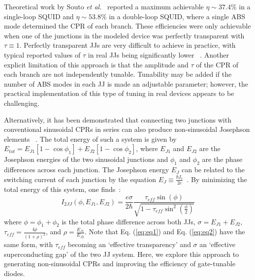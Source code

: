 \documentclass[%
 reprint,
 amsmath,amssymb,
 aps,
]{revtex4-2}
\begin{document}
Theoretical work by Souto {\it et al.}~\cite{Souto2022} reported a maximum achievable $\eta \sim 37.4\%$ in a single-loop SQUID and $\eta \sim 53.8\%$ in a double-loop SQUID, where a single ABS mode determined the CPR of each branch. These efficiencies were only achievable when one of the junctions in the modeled device was perfectly transparent with $\tau\equiv1$. Perfectly transparent JJs are very difficult to achieve in practice, with typical reported values of $\tau$ in real JJs being significantly lower ~\cite{Schonenberger2023,Nichele2020,Leblanc2024}. Another explicit limitation of this approach is that the amplitude and $\tau$ of the CPR of each branch are not independently tunable. Tunability may be added if the number of ABS modes in each JJ is made an adjustable parameter; however, the practical implementation of this type of tuning in real devices appears to be challenging.

Alternatively, it has been demonstrated that connecting two junctions with conventional sinusoidal CPRs in series can also produce non-sinusoidal Josephson elements ~\cite{Marcus2024,Bozkurt2023,Barash2018}. The total energy of such a system is given by $E_{tot}=E_{J1}[1-\cos\phi_1]+E_{J2}[1-\cos\phi_2]$, where $E_{J1}$ and $E_{J2}$ are the Josephson energies of the two sinusoidal junctions and $\phi_1$ and $\phi_2$ are the phase differences across each junction. The Josephson energy $E_J$ can be related to the switching current of each junction by the equation $E_J\equiv\frac{\hbar I_c}{2e}$~\cite{tinkham1996}. By minimizing the total energy of this system, one finds~\cite{JJReview2004,Bozkurt2023}:
\begin{equation}
    \label{eq:eq2}
    I_{2JJ}(\phi,E_{J1},E_{J2}) = \frac{e \sigma}{2\hbar} \frac{\tau_{eff} \sin(\phi)}{\sqrt{1-\tau_{eff} \sin^2(\frac{\phi}{2})}}
\end{equation}
where $\phi=\phi_1+\phi_2$ is the total phase difference across both JJs, $\sigma=E_{J1}+E_{J2}$, $\tau_{eff}=\frac{4\rho}{(1+\rho)^2}$, and $\rho=\frac{E_{J1}}{E_{J2}}$. Note that Eq. (\ref{eq:eq1}) and Eq. (\ref{eq:eq2}) have the same form, with $\tau_{eff}$ becoming an `effective transparency' and $\sigma$ an `effective superconducting gap' of the two JJ system. Here, we explore this approach to generating non-sinusoidal CPRs and improving the efficiency of gate-tunable diodes. 
\end{document}
